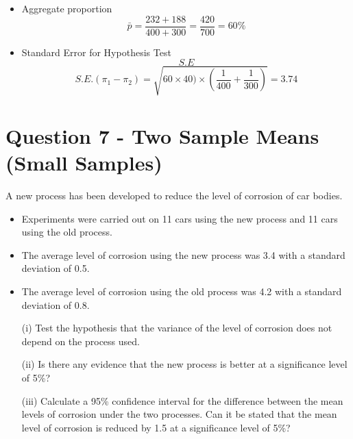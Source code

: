 \documentclass[a4paper,12pt]{article}
\begin{document}

\begin{itemize}
\item Aggregate proportion
\[ \bar{p} = \frac{232 + 188}{400+300} = \frac{420}{700} =60\%\]
\item Standard Error for Hypothesis Test
\[S.E\]\[ S.E.(\pi_1 - \pi_2)  = \sqrt{60 \times 40) \times \left( \frac{1}{400} + \frac{1}{300}\right)}  = 3.74\]

\end{itemize}
\newpage
\section*{Question 7 - Two Sample Means (Small Samples)}
A new process has been developed to reduce the level of corrosion of car bodies.
\begin{itemize}
\item Experiments were carried out on 11 cars using the new process and 11 cars using the old process. \item The average level of corrosion using the new process was 3.4 with a standard deviation of 0.5. \item The average level of corrosion using the old process was 4.2 with a standard deviation of 0.8. 
\end{itemize} 

\begin{itemize}
\item[(i)] Test the hypothesis that the variance of the level of corrosion does not depend on the process used.
\item[(ii)] Is there any evidence that the new process is better at a significance level of 5\%?
\item[(iii)] Calculate a 95\% confidence interval for the difference between the mean levels of corrosion under the two processes. Can it be stated that the mean level of corrosion is reduced by 1.5 at a significance level of 5\%? 
\end{itemize}

\end{document}
